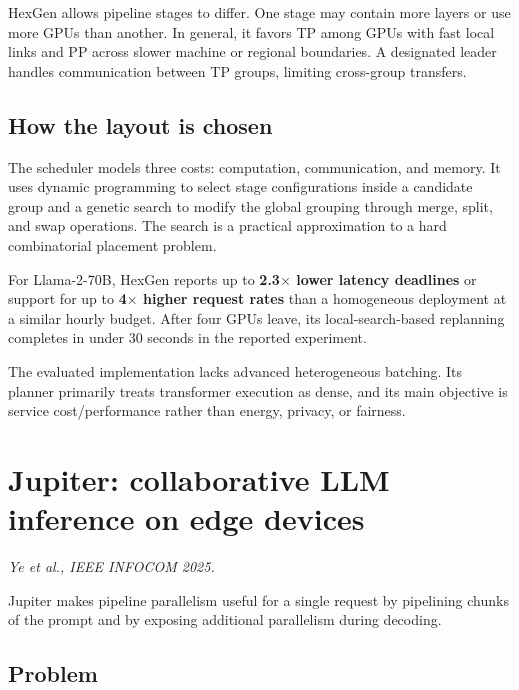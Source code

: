 \documentclass[10pt,a4paper]{article}
\begin{document}
HexGen allows pipeline stages to differ. One stage may contain more layers or use more GPUs than another. In general, it favors TP among GPUs with fast local links and PP across slower machine or regional boundaries. A designated leader handles communication between TP groups, limiting cross-group transfers.

\subsection{How the layout is chosen}

The scheduler models three costs: computation, communication, and memory. It uses dynamic programming to select stage configurations inside a candidate group and a genetic search to modify the global grouping through merge, split, and swap operations. The search is a practical approximation to a hard combinatorial placement problem.

\begin{resultbox}
For Llama-2-70B, HexGen reports up to \textbf{2.3$\times$ lower latency deadlines} or support for up to \textbf{4$\times$ higher request rates} than a homogeneous deployment at a similar hourly budget. After four GPUs leave, its local-search-based replanning completes in under 30 seconds in the reported experiment.
\end{resultbox}

\begin{cautionbox}
The evaluated implementation lacks advanced heterogeneous batching. Its planner primarily treats transformer execution as dense, and its main objective is service cost/performance rather than energy, privacy, or fairness.
\end{cautionbox}

\section{Jupiter: collaborative LLM inference on edge devices}

\textit{Ye et al., IEEE INFOCOM 2025.}

\begin{takeaway}
Jupiter makes pipeline parallelism useful for a single request by pipelining chunks of the prompt and by exposing additional parallelism during decoding.
\end{takeaway}

\subsection{Problem}
\end{document}
